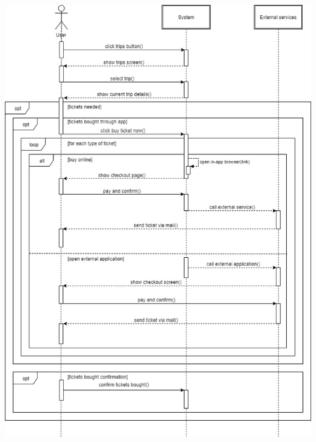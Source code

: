 \begin{center}
\includegraphics[scale=0.519]{MainMatter/images/sequencediagrams/arrange}
\end{center}

